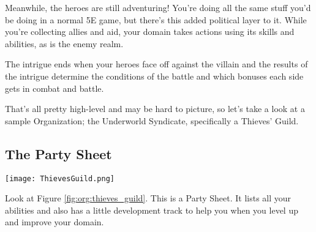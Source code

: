 \documentclass[letterpaper,twocolumn,openany,nodeprecatedcode]{dndbook}
\begin{document}





Meanwhile, the heroes are still adventuring!
You’re doing all the same stuff you’d be doing in a normal 5E game, but there’s this added political layer to it.
While you’re collecting allies and aid, your domain takes actions using its skills and abilities, as is the enemy realm. %

The intrigue ends when your heroes face off against the villain and the results of the intrigue determine the conditions of the battle and which bonuses each side gets in combat and battle.

That’s all pretty high-level and may be hard to picture, so let’s take a look at a sample Organization; the Underworld Syndicate, specifically a Thieves’ Guild.

\pagebreak

\subsection{The Party Sheet}

\begin{figure*}
    \texttt{[image: ThievesGuild.png]}
    \caption{Party Sheet of the Thieves’ Guild.}
    \label{fig:org:thieves_guild}
\end{figure*}

Look at Figure \ref{fig:org:thieves_guild}.
This is a Party Sheet.
It lists all your abilities and also has a little development track to help you when you level up and improve your domain.
\end{document}
